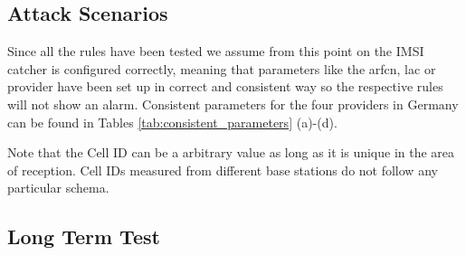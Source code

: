 \subsection{Attack Scenarios}
Since all the rules have been tested we assume from this point on the IMSI catcher is configured correctly, meaning that  parameters like the \gls{arfcn}, \gls{lac} or provider have been set up in correct and consistent way so the respective rules will not show an alarm.
Consistent parameters for the four providers in Germany can be found in Tables \ref{tab:consistent_parameters} (a)-(d).
\begin{table}
\centering
{}
\caption{Consistent parameter configurations in the Freiburg area for the four German providers.}
\label{tab:consistent_parameters}
\end{table}
Note that the Cell ID can be a arbitrary value as long as it is unique in the area of reception. 
Cell IDs measured from different base stations do not follow any particular schema.

\subsection{Long Term Test}